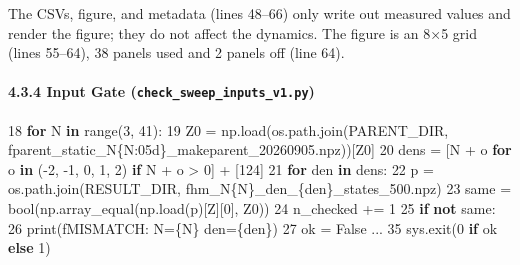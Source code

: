 \documentclass[
  a4paper,
]{ltjsarticle}
\newenvironment{Shaded}{}{}
\newcommand{\BuiltInTok}[1]{\textcolor[rgb]{0.00,0.50,0.00}{#1}}
\newcommand{\ControlFlowTok}[1]{\textcolor[rgb]{0.00,0.44,0.13}{\textbf{#1}}}
\newcommand{\DecValTok}[1]{\textcolor[rgb]{0.25,0.63,0.44}{#1}}
\newcommand{\KeywordTok}[1]{\textcolor[rgb]{0.00,0.44,0.13}{\textbf{#1}}}
\newcommand{\NormalTok}[1]{#1}
\newcommand{\OperatorTok}[1]{\textcolor[rgb]{0.40,0.40,0.40}{#1}}
\newcommand{\SpecialCharTok}[1]{\textcolor[rgb]{0.25,0.44,0.63}{#1}}
\newcommand{\SpecialStringTok}[1]{\textcolor[rgb]{0.73,0.40,0.53}{#1}}
\newcommand{\StringTok}[1]{\textcolor[rgb]{0.25,0.44,0.63}{#1}}
\newcommand{\VariableTok}[1]{\textcolor[rgb]{0.10,0.09,0.49}{#1}}
\begin{document}
The CSVs, figure, and metadata (lines 48--66) only write out measured
values and render the figure; they do not affect the dynamics. The
figure is an 8×5 grid (lines 55--64), 38 panels used and 2 panels off
(line 64).

\paragraph{\texorpdfstring{4.3.4 Input Gate
(\texttt{check\_sweep\_inputs\_v1.py})}{4.3.4 Input Gate (check\_sweep\_inputs\_v1.py)}}\label{input-gate-check_sweep_inputs_v1.py}

\begin{Shaded}
\begin{Highlighting}[]
    \DecValTok{18}  \ControlFlowTok{for}\NormalTok{ N }\KeywordTok{in} \BuiltInTok{range}\NormalTok{(}\DecValTok{3}\NormalTok{, }\DecValTok{41}\NormalTok{):}
    \DecValTok{19}\NormalTok{      Z0 }\OperatorTok{=}\NormalTok{ np.load(os.path.join(PARENT\_DIR, }\SpecialStringTok{f\textquotesingle{}parent\_static\_N}\SpecialCharTok{\{}\NormalTok{N}\SpecialCharTok{:05d\}}\SpecialStringTok{\_makeparent\_20260905.npz\textquotesingle{}}\NormalTok{))[}\StringTok{\textquotesingle{}Z0\textquotesingle{}}\NormalTok{]}
    \DecValTok{20}\NormalTok{      dens }\OperatorTok{=}\NormalTok{ [N }\OperatorTok{+}\NormalTok{ o }\ControlFlowTok{for}\NormalTok{ o }\KeywordTok{in}\NormalTok{ (}\OperatorTok{{-}}\DecValTok{2}\NormalTok{, }\OperatorTok{{-}}\DecValTok{1}\NormalTok{, }\DecValTok{0}\NormalTok{, }\DecValTok{1}\NormalTok{, }\DecValTok{2}\NormalTok{) }\ControlFlowTok{if}\NormalTok{ N }\OperatorTok{+}\NormalTok{ o }\OperatorTok{\textgreater{}} \DecValTok{0}\NormalTok{] }\OperatorTok{+}\NormalTok{ [}\DecValTok{124}\NormalTok{]}
    \DecValTok{21}      \ControlFlowTok{for}\NormalTok{ den }\KeywordTok{in}\NormalTok{ dens:}
    \DecValTok{22}\NormalTok{          p }\OperatorTok{=}\NormalTok{ os.path.join(RESULT\_DIR, }\SpecialStringTok{f\textquotesingle{}hm\_N}\SpecialCharTok{\{}\NormalTok{N}\SpecialCharTok{\}}\SpecialStringTok{\_den\_}\SpecialCharTok{\{}\NormalTok{den}\SpecialCharTok{\}}\SpecialStringTok{\_states\_500.npz\textquotesingle{}}\NormalTok{)}
    \DecValTok{23}\NormalTok{          same }\OperatorTok{=} \BuiltInTok{bool}\NormalTok{(np.array\_equal(np.load(p)[}\StringTok{\textquotesingle{}Z\textquotesingle{}}\NormalTok{][}\DecValTok{0}\NormalTok{], Z0))}
    \DecValTok{24}\NormalTok{          n\_checked }\OperatorTok{+=} \DecValTok{1}
    \DecValTok{25}          \ControlFlowTok{if} \KeywordTok{not}\NormalTok{ same:}
    \DecValTok{26}              \BuiltInTok{print}\NormalTok{(}\SpecialStringTok{f\textquotesingle{}MISMATCH: N=}\SpecialCharTok{\{}\NormalTok{N}\SpecialCharTok{\}}\SpecialStringTok{ den=}\SpecialCharTok{\{}\NormalTok{den}\SpecialCharTok{\}}\SpecialStringTok{\textquotesingle{}}\NormalTok{)}
    \DecValTok{27}\NormalTok{              ok }\OperatorTok{=} \VariableTok{False}
\NormalTok{...}
    \DecValTok{35}\NormalTok{  sys.exit(}\DecValTok{0} \ControlFlowTok{if}\NormalTok{ ok }\ControlFlowTok{else} \DecValTok{1}\NormalTok{)}
\end{Highlighting}
\end{Shaded}
\end{document}
